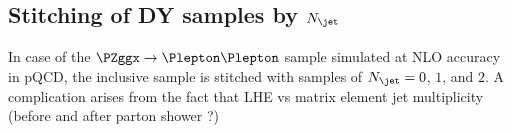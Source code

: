\subsection{Stitching of DY samples by $N_{\jet}$}

In case of the $\PZggx \to \Plepton\Plepton$ sample simulated at NLO accuracy in pQCD,
the inclusive sample is stitched with samples of $N_{\jet} = 0$, $1$, and $2$.
A complication arises from the fact that LHE vs matrix element jet multiplicity (before and after parton shower ?)
